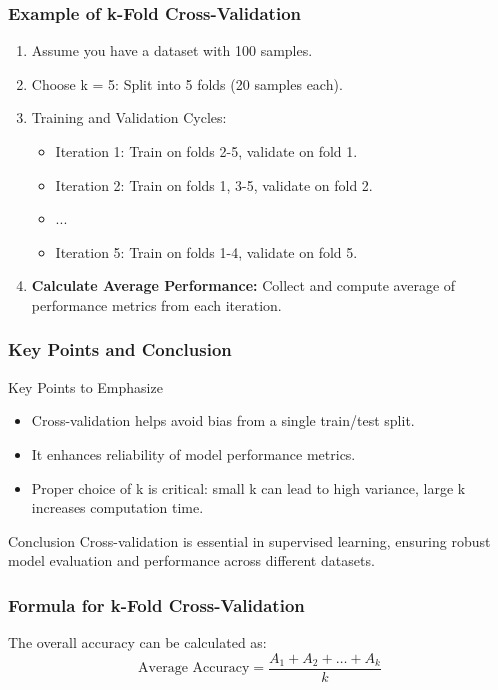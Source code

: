 \documentclass[aspectratio=169]{beamer}
\begin{document}
\begin{frame}[fragile]
    \frametitle{Example of k-Fold Cross-Validation}
    \begin{enumerate}
        \item Assume you have a dataset with 100 samples.
        \item Choose k = 5: Split into 5 folds (20 samples each).
        \item Training and Validation Cycles:
        \begin{itemize}
            \item Iteration 1: Train on folds 2-5, validate on fold 1.
            \item Iteration 2: Train on folds 1, 3-5, validate on fold 2.
            \item ...
            \item Iteration 5: Train on folds 1-4, validate on fold 5.
        \end{itemize}
        \item \textbf{Calculate Average Performance:} 
        Collect and compute average of performance metrics from each iteration.
    \end{enumerate}
\end{frame}

\begin{frame}[fragile]
    \frametitle{Key Points and Conclusion}
    \begin{block}{Key Points to Emphasize}
        \begin{itemize}
            \item Cross-validation helps avoid bias from a single train/test split.
            \item It enhances reliability of model performance metrics.
            \item Proper choice of k is critical: small k can lead to high variance, large k increases computation time.
        \end{itemize}
    \end{block}

    \begin{block}{Conclusion}
        Cross-validation is essential in supervised learning, ensuring robust model evaluation and performance across different datasets.
    \end{block}
\end{frame}

\begin{frame}[fragile]
    \frametitle{Formula for k-Fold Cross-Validation}
    The overall accuracy can be calculated as:
    \begin{equation}
        \text{Average Accuracy} = \frac{A_1 + A_2 + \ldots + A_k}{k}
    \end{equation}
\end{frame}
\end{document}
